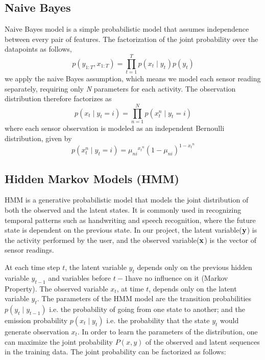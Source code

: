 \documentclass[11pt, oneside]{article}   	%
\begin{document}
\subsection{Naive Bayes}
Naive Bayes model is a simple probabilistic model that assumes independence between every pair of features. 
The factorization of the joint probability over the datapoints as follows,
\begin{equation}
p({y}_{1:T},{x}_{1:T})=\prod_{t=1}^{T}p({{x}_{t}\mid {y}_{t}}^{})p({y}_{t})
\end{equation}
we apply the naive Bayes assumption, which means we model each sensor reading separately, requiring only
\textit{N} parameters for each activity. The observation distribution therefore factorizes as
\begin{equation}
p({x}_{t}\mid{y}_{t}=i)=\prod_{n=1}^{N}p({{x}_{t}^{n}\mid {y}_{t}}=i)
\end{equation}
where each sensor observation is modeled as an independent Bernoulli distribution, given by
\begin{equation}
p({{x}_{t}^{n}\mid {y}_{t}}=i)={{\mu}_{ni}}^{{{x}_{t}}^n}{(1-{\mu}_{ni})}^{1-{{x}_{t}}^n}
\end{equation}

\subsection{Hidden Markov Models (HMM)}
HMM is a generative probabilistic model that models the joint distribution of both the observed and the latent states. It is commonly used in recognizing temporal patterns such as handwriting and speech recognition, where the future state is dependent on the previous state.  In our project, the latent variable($\bf{y}$) is the activity performed by the user, and the observed variable($\bf{x}$) is the vector of sensor readings. 

At each time step $t$, the latent variable $y_t$ depends only on the previous hidden variable $y_{t-1}$ and variables before $t-1$have no influence on it (Markov Property). The observed variable $x_t$, at time $t$, depends only on the latent variable $y_t$. The parameters of the HMM model are the transition probabilities $p(y_{t}\mid y_{t-1})$ i.e.  the probability of going from one state to another; and the emission probability $p(x_{t}\mid y_{t})$ i.e. the probability that the state $y_t$ would generate observation $x_{t}$. In order to learn the parameters of the distribution, one can maximize the joint probability $P(x,y)$ of the observed and latent sequences in the training data. The joint probability can be factorized as follows:
\end{document}
